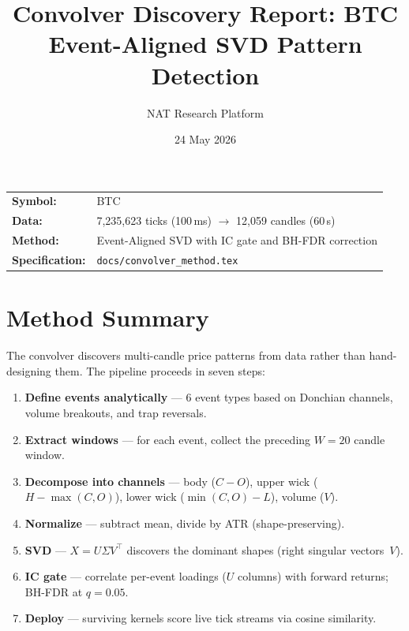\documentclass[11pt,a4paper]{article}
\title{\textbf{Convolver Discovery Report: BTC}\\[0.5em]
\large Event-Aligned SVD Pattern Detection}
\author{NAT Research Platform}
\date{24 May 2026}
\begin{document}
\maketitle

\begin{center}
\begin{tabular}{ll}
\textbf{Symbol:} & BTC \\
\textbf{Data:} & 7,235,623 ticks (100\,ms) $\to$ 12,059 candles (60\,s) \\
\textbf{Method:} & Event-Aligned SVD with IC gate and BH-FDR correction \\
\textbf{Specification:} & \texttt{docs/convolver\_method.tex} \\
\end{tabular}
\end{center}

\vspace{1em}

\section{Method Summary}

The convolver discovers multi-candle price patterns from data rather than
hand-designing them.  The pipeline proceeds in seven steps:

\begin{enumerate}
\item \textbf{Define events analytically} --- 6 event types based on Donchian
      channels, volume breakouts, and trap reversals.
\item \textbf{Extract windows} --- for each event, collect the preceding
      $W = 20$ candle window.
\item \textbf{Decompose into channels} --- body ($C{-}O$), upper wick
      ($H{-}\max(C,O)$), lower wick ($\min(C,O){-}L$), volume ($V$).
\item \textbf{Normalize} --- subtract mean, divide by ATR (shape-preserving).
\item \textbf{SVD} --- $X = U\Sigma V^\top$ discovers the dominant shapes
      (right singular vectors~$V$).
\item \textbf{IC gate} --- correlate per-event loadings ($U$ columns) with
      forward returns; BH-FDR at $q = 0.05$.
\item \textbf{Deploy} --- surviving kernels score live tick streams via cosine
      similarity.
\end{enumerate}
\end{document}
